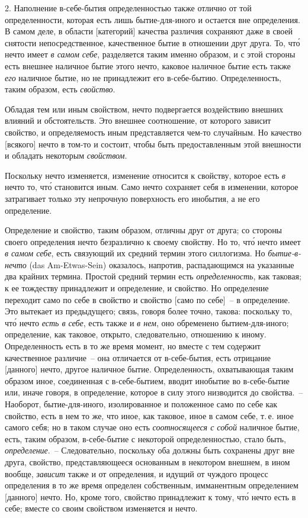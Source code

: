 2. Наполнение в-себе-бытия определенностью также
отлично от той определенности, которая есть лишь бытие-для-иного
и остается вне определения. В самом деле, в
области [категорий] качества различия сохраняют даже
в своей снятости непосредственное, качественное бытие в
отношении друг друга. То, чт\'о нечто имеет \emph{в самом себе},
разделяется таким именно образом, и с этой стороны
есть внешнее наличное бытие этого нечто, каковое наличное
бытие есть также \emph{его} наличное бытие, но не принадлежит
его в-себе-бытию. Определенность, таким образом,
есть \emph{свойство}.

Обладая тем или иным свойством, нечто подвергается
воздействию внешних влияний и обстоятельств. Это внешнее
соотношение, от которого зависит свойство, и определяемость
иным представляется чем-то случайным. Но
качество [всякого] нечто в том-то и состоит, чтобы быть
предоставленным этой внешности и обладать некоторым
\emph{свойством}.

Поскольку нечто изменяется, изменение относится
к свойству, которое есть \emph{в} нечто то, чт\'о становится иным.
Само нечто сохраняет себя в изменении, которое затрагивает
только эту непрочную поверхность его инобытия,
а не его определение.

Определение и свойство, таким образом, отличны
друг от друга; со стороны своего определения нечто безразлично
к своему свойству. Но то, чт\'о нечто имеет
\emph{в самом себе}, есть связующий их средний термин этого
силлогизма. Но \emph{бытие-в-нечто} (das Am-Etwas-Sein) оказалось,
напротив, распадающимся на указанные два крайних
термина. Простой средний термин есть \emph{определенность},
как таковая; к ее тождеству принадлежит и определение,
и свойство. Но определение переходит само по
себе в свойство и свойство [само по себе]~-- в определение.
Это вытекает из предыдущего; связь, говоря более
точно, такова: поскольку то, чт\'о нечто \emph{есть в себе}, есть
также и \emph{в нем}, оно обременено бытием-для-иного; определение,
как таковое, открыто, следовательно, отношению
к иному. Определенность есть в то же время момент, но
вместе с тем содержит качественное различие~-- она
отличается от в-себе-бытия, есть отрицание [данного] нечто,
другое наличное бытие. Определенность, охватывающая
таким образом иное, соединенная с в-себе-бытием,
вводит инобытие во в-себе-бытие или, иначе говоря, в
определение, которое в силу этого низводится до свойства.~--
Наоборот, бытие-для-иного, изолированное и положенное
само по себе как свойство, есть в нем то же, что
иное, как таковое, иное в самом себе, т.\,е. иное самого
себя; но в таком случае оно есть \emph{соотносящееся с собой}
наличное бытие, есть, таким образом, в-себе-бытие с некоторой
определенностью, стало быть, \emph{определение}.~--
Следовательно, поскольку оба должны быть сохранены
друг вне друга, свойство, представляющееся основанным
в некотором внешнем, в ином вообще, \emph{зависит} также и
от определения, и идущий от чуждого процесс определения
в то же время определен собственным, имманентным
определением [данного] нечто. Но, кроме того, свойство
принадлежит к тому, чт\'о нечто есть в себе; вместе со
своим свойством изменяется и нечто.

